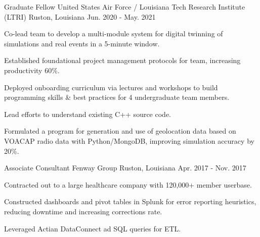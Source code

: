 \begin{cventries}
  \cventry
    {Graduate Fellow} %
    {United States Air Force / Louisiana Tech Research Institute (LTRI)} %
    {Ruston, Louisiana} %
    {Jun. 2020 - May. 2021} %
    {
      \begin{cvitems} %
        \item {Co-lead team to develop a multi-module system for digital twinning of simulations and real events in a 5-minute window.}
        \item {Established foundational project management protocols for team, increasing productivity 60\%.}
        \item {Deployed onboarding curriculum via lectures and workshops to build programming skills \& best practices for 4 undergraduate team members.}
        \item {Lead efforts to understand existing C++ source code.}
        \item {Formulated a program for generation and use of geolocation data based on VOACAP radio data with Python/MongoDB, improving simulation accuracy by 20\%.}
      \end{cvitems}
    }

  \cventry
    {Associate Consultant} %
    {Fenway Group} %
    {Ruston, Louisiana} %
    {Apr. 2017 - Nov. 2017} %
    {
      \begin{cvitems} %
        \item {Contracted out to a large healthcare company with 120,000+ member userbase.}
	      \item {Constructed dashboards and pivot tables in Splunk for error reporting heuristics, reducing downtime and increasing corrections rate.}
        \item {Leveraged Actian DataConnect ad SQL queries for ETL.}
      \end{cvitems}
    }


\end{cventries}


